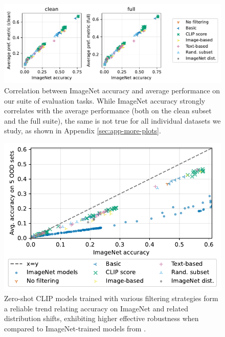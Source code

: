 \begin{figure}
    \centering
    \includegraphics[width=\linewidth]{figures/imagenet_vs_all.pdf}
    \caption{Correlation between ImageNet accuracy and average performance on our suite of evaluation tasks. While ImageNet accuracy strongly correlates with the average performance (both on the clean subset and the full suite), the same is not true for all individual datasets we study, as shown in Appendix \ref{sec:app-more-plots}.}
    \label{fig:imagenet-vs-all}
\end{figure}

\begin{figure}
    \centering
    \includegraphics[width=0.7\linewidth]{figures/robustness.pdf}
    \caption{Zero-shot CLIP models trained with various filtering strategies form a reliable trend relating accuracy on ImageNet and related distribution shifts, exhibiting higher effective robustness when compared to ImageNet-trained models from \citet{taori2020measuring}.}
    \label{fig:robustness}
\end{figure}

\FloatBarrier


